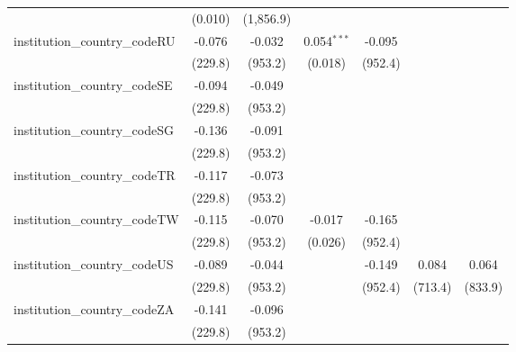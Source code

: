 \begin{tabular}{lcccccc}
                                         & (0.010)        & (1,856.9)     &                &               &               &   \\   
   institution\_country\_codeRU          & -0.076         & -0.032        & 0.054$^{***}$  & -0.095        &               &   \\   
                                         & (229.8)        & (953.2)       & (0.018)        & (952.4)       &               &   \\   
   institution\_country\_codeSE          & -0.094         & -0.049        &                &               &               &   \\   
                                         & (229.8)        & (953.2)       &                &               &               &   \\   
   institution\_country\_codeSG          & -0.136         & -0.091        &                &               &               &   \\   
                                         & (229.8)        & (953.2)       &                &               &               &   \\   
   institution\_country\_codeTR          & -0.117         & -0.073        &                &               &               &   \\   
                                         & (229.8)        & (953.2)       &                &               &               &   \\   
   institution\_country\_codeTW          & -0.115         & -0.070        & -0.017         & -0.165        &               &   \\   
                                         & (229.8)        & (953.2)       & (0.026)        & (952.4)       &               &   \\   
   institution\_country\_codeUS          & -0.089         & -0.044        &                & -0.149        & 0.084         & 0.064\\   
                                         & (229.8)        & (953.2)       &                & (952.4)       & (713.4)       & (833.9)\\   
   institution\_country\_codeZA          & -0.141         & -0.096        &                &               &               &   \\   
                                         & (229.8)        & (953.2)       &                &               &               &   \\   

\end{tabular}
